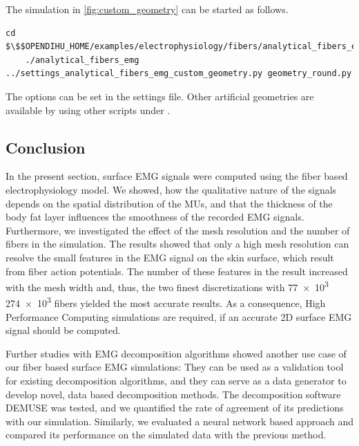 \begin{reproduce_no_break}
  The simulation in \cref{fig:custom_geometry} can be started as follows.
  \begin{lstlisting}[columns=fullflexible,breaklines=true,postbreak=\mbox{\textcolor{gray}{$\hookrightarrow$}\space}]
    cd $\$$OPENDIHU_HOME/examples/electrophysiology/fibers/analytical_fibers_emg/build_release
    ./analytical_fibers_emg ../settings_analytical_fibers_emg_custom_geometry.py geometry_round.py
  \end{lstlisting}
  The options can be set in the  settings file. Other artificial geometries are available by using other scripts under .
\end{reproduce_no_break}

\subsection{Conclusion}

In the present section, surface EMG signals were computed using the fiber based electrophysiology model. We showed, how the qualitative nature of the signals depends on the spatial distribution of the MUs, and that the thickness of the body fat layer influences the smoothness of the recorded EMG signals. Furthermore, we investigated the effect of the mesh resolution and the number of fibers in the simulation. The results showed that only a high mesh resolution can resolve the small features in the EMG signal  on the skin surface, which result from fiber action potentials. The number of these features in the result increased with the mesh width and, thus, the two finest discretizations with \num{77e3} \num{274e3} fibers yielded the most accurate results. As a consequence, High Performance Computing simulations are required, if an accurate 2D surface EMG signal should be computed.

Further studies with EMG decomposition algorithms showed another use case of our fiber based surface EMG simulations: They can be used as a validation tool for existing decomposition algorithms, and they can serve as a data generator to develop novel, data based decomposition methods. The decomposition software DEMUSE was tested, and we quantified the rate of agreement of its predictions with our simulation. Similarly, we evaluated a neural network based approach and compared its performance on the simulated data with the previous method.
